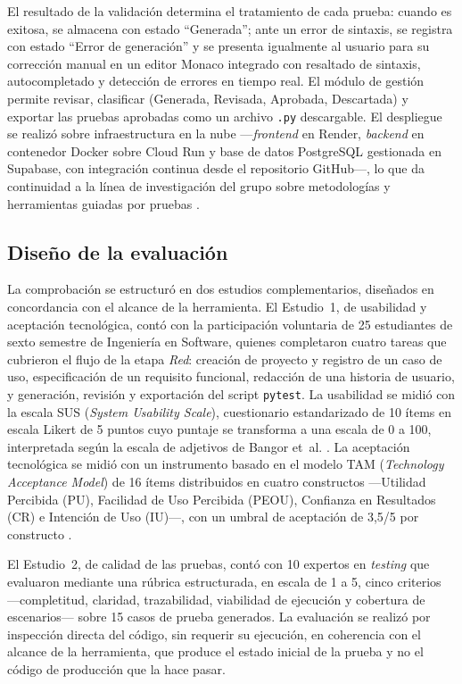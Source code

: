 \documentclass[10pt,journal,twoside,letterpaper]{IEEEtran}
\begin{document}
	El resultado de la validación determina el tratamiento de cada prueba: cuando es exitosa, se almacena con estado ``Generada''; ante un error de sintaxis, se registra con estado ``Error de generación'' y se presenta igualmente al usuario para su corrección manual en un editor Monaco integrado con resaltado de sintaxis, autocompletado y detección de errores en tiempo real. El módulo de gestión permite revisar, clasificar (Generada, Revisada, Aprobada, Descartada) y exportar las pruebas aprobadas como un archivo \texttt{.py} descargable. El despliegue se realizó sobre infraestructura en la nube ---\emph{frontend} en Render, \emph{backend} en contenedor Docker sobre Cloud Run y base de datos PostgreSQL gestionada en Supabase, con integración continua desde el repositorio GitHub---, lo que da continuidad a la línea de investigación del grupo sobre metodologías y herramientas guiadas por pruebas \cite{guerrero2020tddm4iots,guerrero2025tddtool,guerrero2023agile}.

	\subsection{Diseño de la evaluación}
	\label{subsec:validacion}

	La comprobación se estructuró en dos estudios complementarios, diseñados en concordancia con el alcance de la herramienta. El Estudio~1, de usabilidad y aceptación tecnológica, contó con la participación voluntaria de 25 estudiantes de sexto semestre de Ingeniería en Software, quienes completaron cuatro tareas que cubrieron el flujo de la etapa \emph{Red}: creación de proyecto y registro de un caso de uso, especificación de un requisito funcional, redacción de una historia de usuario, y generación, revisión y exportación del script \texttt{pytest}. La usabilidad se midió con la escala SUS (\emph{System Usability Scale}), cuestionario estandarizado de 10 ítems en escala Likert de 5 puntos cuyo puntaje se transforma a una escala de 0 a 100, interpretada según la escala de adjetivos de Bangor et~al. \cite{brooke1996sus,bangor2009sus}. La aceptación tecnológica se midió con un instrumento basado en el modelo TAM (\emph{Technology Acceptance Model}) de 16 ítems distribuidos en cuatro constructos ---Utilidad Percibida (PU), Facilidad de Uso Percibida (PEOU), Confianza en Resultados (CR) e Intención de Uso (IU)---, con un umbral de aceptación de 3,5/5 por constructo \cite{davis1989tam}.

	El Estudio~2, de calidad de las pruebas, contó con 10 expertos en \emph{testing} que evaluaron mediante una rúbrica estructurada, en escala de 1 a 5, cinco criterios ---completitud, claridad, trazabilidad, viabilidad de ejecución y cobertura de escenarios--- sobre 15 casos de prueba generados. La evaluación se realizó por inspección directa del código, sin requerir su ejecución, en coherencia con el alcance de la herramienta, que produce el estado inicial de la prueba y no el código de producción que la hace pasar.
\end{document}
